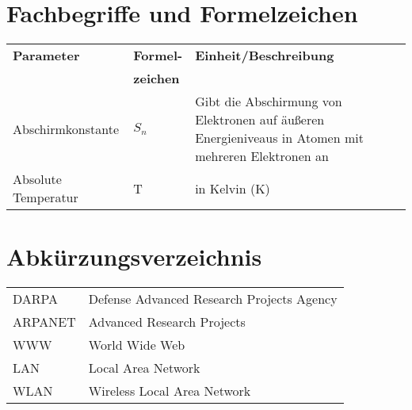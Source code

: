 \section*{Fachbegriffe und Formelzeichen}
\begin{longtable}{llp{6.5cm}}
	\textbf{Parameter} & \textbf{Formel-} & \textbf{Einheit/Beschreibung}\\
	 & \textbf{zeichen} & \\
	Abschirmkonstante & $ S_n $ & Gibt die Abschirmung von Elektronen auf äußeren Energieniveaus in Atomen mit mehreren Elektronen an\\
	Absolute Temperatur & T & in Kelvin (K)\\ 
\end{longtable}

\vspace{1cm}


\section*{Abkürzungsverzeichnis}

\begin{tabularx}{0.9\columnwidth}{lX}
	DARPA & Defense Advanced Research Projects Agency\\
	ARPANET & Advanced Research Projects\\
	WWW & World Wide Web \\
	LAN & Local Area Network \\
	WLAN & Wireless Local Area Network \\

\end{tabularx}



	
%

